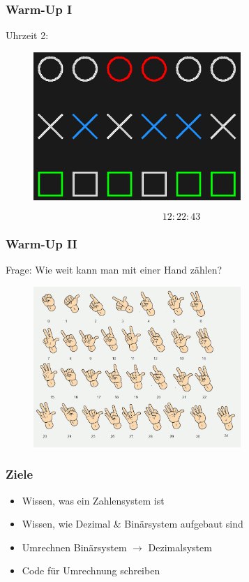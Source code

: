\documentclass{beamer}
\begin{document}
\begin{frame}
    \frametitle{Warm-Up I}
    Uhrzeit 2:
    \begin{figure}[H]
        \centering
        \includegraphics[width=0.7\textwidth]{12_22_43_dark}
    \end{figure}
     $$12:22:43$$
\end{frame}

\begin{frame}
    \frametitle{Warm-Up II}
    Frage: Wie weit kann man mit einer Hand zählen?
    \begin{figure}[H]
        \centering
        \includegraphics[width=0.7\textwidth]{binarycount}
    \end{figure}
\end{frame}

\begin{frame}
    \frametitle{Ziele}
    \begin{itemize}
        \item Wissen, was ein Zahlensystem ist
        \item {} Wissen, wie Dezimal \& Binärsystem aufgebaut sind
        \item {} Umrechnen Binärsystem $\rightarrow$ Dezimalsystem
        \item {} Code für Umrechnung schreiben
    \end{itemize}
\end{frame}
\end{document}
